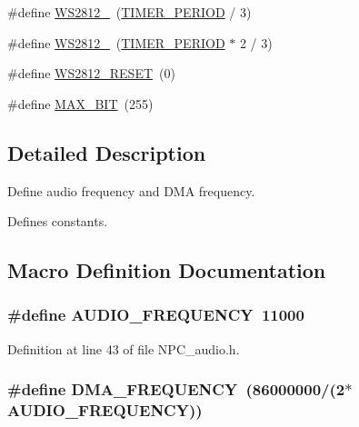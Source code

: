 \begin{DoxyCompactItemize}
\item 
\#define \hyperlink{group___constant_ga3c67cd1a76ba7e85676da5f023f42430}{W\+S2812\+\_}~(\hyperlink{group___constant_gad888acf7c13a4bedd6541ceb5cf9bf6d}{T\+I\+M\+E\+R\+\_\+\+P\+E\+R\+I\+OD} / 3)
\item 
\#define \hyperlink{group___constant_gad4cec7bff3f072ffe9ec1e11324c7418}{W\+S2812\+\_}~(\hyperlink{group___constant_gad888acf7c13a4bedd6541ceb5cf9bf6d}{T\+I\+M\+E\+R\+\_\+\+P\+E\+R\+I\+OD} $\ast$ 2 / 3)
\item 
\#define \hyperlink{group___constant_gaef8a90792d52a7085de6c0affec15557}{W\+S2812\+\_\+\+R\+E\+S\+ET}~(0)
\item 
\#define \hyperlink{group___constant_gaaf645a2813f2274619a70855afb92aca}{M\+A\+X\+\_\+B\+IT}~(255)
\end{DoxyCompactItemize}


\subsection{Detailed Description}
Define audio frequency and D\+MA frequency. 

Defines constants.

\subsection{Macro Definition Documentation}
\subsubsection[{\texorpdfstring{A\+U\+D\+I\+O\+\_\+\+F\+R\+E\+Q\+U\+E\+N\+CY}{AUDIO_FREQUENCY}}]{\setlength{\rightskip}{0pt plus 5cm}\#define A\+U\+D\+I\+O\+\_\+\+F\+R\+E\+Q\+U\+E\+N\+CY~11000}\hypertarget{group___constant_gaae969438a57a86fddf0cf53106c9b6b4}{}\label{group___constant_gaae969438a57a86fddf0cf53106c9b6b4}


Definition at line 43 of file N\+P\+C\+\_\+audio.\+h.

\subsubsection[{\texorpdfstring{D\+M\+A\+\_\+\+F\+R\+E\+Q\+U\+E\+N\+CY}{DMA_FREQUENCY}}]{\setlength{\rightskip}{0pt plus 5cm}\#define D\+M\+A\+\_\+\+F\+R\+E\+Q\+U\+E\+N\+CY~(86000000/(2$\ast${\bf A\+U\+D\+I\+O\+\_\+\+F\+R\+E\+Q\+U\+E\+N\+CY}))}\hypertarget{group___constant_ga644d7863b10926e5fb77205f294e1964}{}\label{group___constant_ga644d7863b10926e5fb77205f294e1964}


